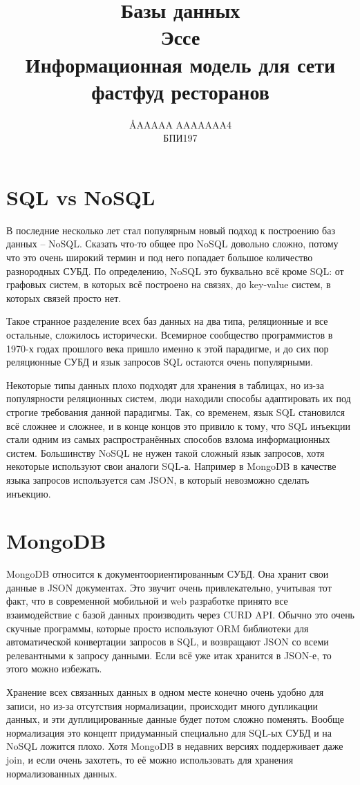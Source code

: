 \documentclass[12pt]{article}
\title{Базы данных \\ Эссе \\ Информационная модель для сети фастфуд ресторанов}
\author{\AA{AAAAA AAAAAAA}{4} \\ БПИ197}
\begin{document}
  \maketitle

  \section{SQL vs NoSQL}
  В последние несколько лет стал популярным новый подход к построению баз данных -- NoSQL.
  Сказать что-то общее про NoSQL довольно сложно, потому что это очень широкий термин
  и под него попадает большое количество разнородных СУБД.
  По определению, NoSQL это буквально всё кроме SQL:
  от графовых систем, в которых всё построено на связях, до key-value систем, в которых связей просто нет.

  Такое странное разделение всех баз данных на два типа, реляционные и все остальные, сложилось исторически.
  Всемирное сообщество программистов в 1970-х годах прошлого века пришло именно к этой парадигме,
  и до сих пор реляционные СУБД и язык запросов SQL остаются очень популярными.

  Некоторые типы данных плохо подходят для хранения в таблицах, но из-за популярности реляционных систем,
  люди находили способы адаптировать их под строгие требования данной парадигмы.
  Так, со временем, язык SQL становился всё сложнее и сложнее, и в конце концов это привило к тому,
  что SQL инъекции стали одним из самых распространённых способов взлома информационных систем.
  Большинству NoSQL не нужен такой сложный язык запросов, хотя некоторые используют свои аналоги SQL-а.
  Например в MongoDB в качестве языка запросов используется сам JSON, в который невозможно сделать инъекцию.

  \section{MongoDB}
  MongoDB относится к документоориентированным СУБД.
  Она хранит свои данные в JSON документах.
  Это звучит очень привлекательно, учитывая тот факт,
  что в современной мобильной и web разработке принято все взаимодействие с базой данных производить через CURD API.
  Обычно это очень скучные программы, которые просто используют ORM библиотеки для автоматической конвертации запросов в SQL,
  и возвращают JSON со всеми релевантными к запросу данными.
  Если всё уже итак хранится в JSON-е, то этого можно избежать.

  Хранение всех связанных данных в одном месте конечно очень удобно для записи,
  но из-за отсутствия нормализации, происходит много дупликации данных, и эти дуплицированные данные будет потом сложно поменять.
  Вообще нормализация это концепт придуманный специально для SQL-ых СУБД и на NoSQL ложится плохо.
  Хотя MongoDB в недавних версиях поддерживает даже join, и если очень захотеть,
  то её можно использовать для хранения нормализованных данных.
\end{document}
